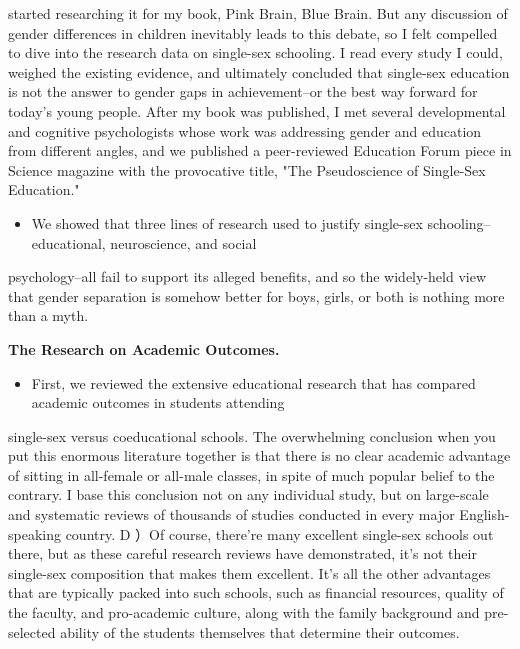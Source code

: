 \documentclass[UTF8,11pt]{ctexart}
\begin{document}
started researching it for my book, Pink Brain, Blue Brain. But any discussion of gender differences in children inevitably leads to this debate, so I felt compelled to dive into the research data on single-sex schooling. I read every study I could, weighed the existing evidence, and ultimately concluded that single-sex education is not the answer to gender gaps in achievement--or the best way forward for today's young people. After my book was published, I met several developmental and cognitive psychologists whose work was addressing gender and education from different angles, and we published a peer-reviewed Education Forum piece in Science magazine with the provocative title, "The Pseudoscience of Single-Sex Education."


\begin{itemize}[leftmargin=2em,itemsep=.2em,topsep=.4em]\item[B.] We showed that three lines of research used to justify single-sex schooling--educational, neuroscience, and social
\end{itemize}

psychology--all fail to support its alleged benefits, and so the widely-held view that gender separation is somehow better for boys, girls, or both is nothing more than a myth.


\textbf{The Research on Academic Outcomes.}


\begin{itemize}[leftmargin=2em,itemsep=.2em,topsep=.4em]\item[C.] First, we reviewed the extensive educational research that has compared academic outcomes in students attending
\end{itemize}

single-sex versus coeducational schools. The overwhelming conclusion when you put this enormous literature together is that there is no clear academic advantage of sitting in all-female or all-male classes, in spite of much popular belief to the contrary. I base this conclusion not on any individual study, but on large-scale and systematic reviews of thousands of studies conducted in every major English-speaking country. D ）Of course, there’re many excellent single-sex schools out there, but as these careful research reviews have demonstrated, it's not their single-sex composition that makes them excellent. It's all the other advantages that are typically packed into such schools, such as financial resources, quality of the faculty, and pro-academic culture, along with the family background and pre-selected ability of the students themselves that determine their outcomes.
\end{document}

